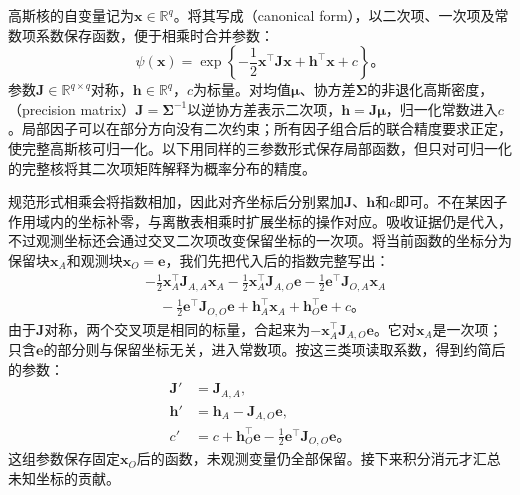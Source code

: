 高斯核的自变量记为$\bm{x}\in\mathbb{R}^{q}$。将其写成（canonical form），以二次项、一次项及常数项系数保存函数，便于相乘时合并参数：
\begin{equation}
  \psi(\bm{x})
  =\exp\!\left\{-\frac12\bm{x}^{\top}\bm{J}\bm{x}
                  +\bm{h}^{\top}\bm{x}+c\right\}
  \text{。}
  \label{eq:pgm-elimination-gaussian-canonical}
\end{equation}
参数$\bm{J}\in\mathbb{R}^{q\times q}$对称，$\bm{h}\in\mathbb{R}^{q}$，$c$为标量。对均值$\bm{\mu}$、协方差$\bm{\Sigma}$的非退化高斯密度，（precision matrix）$\bm{J}=\bm{\Sigma}^{-1}$以逆协方差表示二次项，$\bm{h}=\bm{J}\bm{\mu}$，归一化常数进入$c$。局部因子可以在部分方向没有二次约束；所有因子组合后的联合精度要求正定，使完整高斯核可归一化。以下用同样的三参数形式保存局部函数，但只对可归一化的完整核将其二次项矩阵解释为概率分布的精度。

规范形式相乘会将指数相加，因此对齐坐标后分别累加$\bm{J}$、$\bm{h}$和$c$即可。不在某因子作用域内的坐标补零，与离散表相乘时扩展坐标的操作对应。吸收证据仍是代入，不过观测坐标还会通过交叉二次项改变保留坐标的一次项。将当前函数的坐标分为保留块$\bm{x}_A$和观测块$\bm{x}_O=\bm{e}$，我们先把代入后的指数完整写出：
\[
  \begin{aligned}
    &-\frac12\bm{x}_A^{\top}\bm{J}_{A,A}\bm{x}_A
      -\frac12\bm{x}_A^{\top}\bm{J}_{A,O}\bm{e}
      -\frac12\bm{e}^{\top}\bm{J}_{O,A}\bm{x}_A\\
    &\quad-\frac12\bm{e}^{\top}\bm{J}_{O,O}\bm{e}
      +\bm{h}_A^{\top}\bm{x}_A+\bm{h}_O^{\top}\bm{e}+c
      \text{。}
  \end{aligned}
\]
由于$\bm{J}$对称，两个交叉项是相同的标量，合起来为$-\bm{x}_A^{\top}\bm{J}_{A,O}\bm{e}$。它对$\bm{x}_A$是一次项；只含$\bm{e}$的部分则与保留坐标无关，进入常数项。按这三类项读取系数，得到约简后的参数：
\[
  \begin{aligned}
    \bm{J}'&=\bm{J}_{A,A},\\
    \bm{h}'&=\bm{h}_A-\bm{J}_{A,O}\bm{e},\\
    c'&=c+\bm{h}_O^{\top}\bm{e}
       -\frac12\bm{e}^{\top}\bm{J}_{O,O}\bm{e}
       \text{。}
  \end{aligned}
\]
这组参数保存固定$\bm{x}_O$后的函数，未观测变量仍全部保留。接下来积分消元才汇总未知坐标的贡献。

